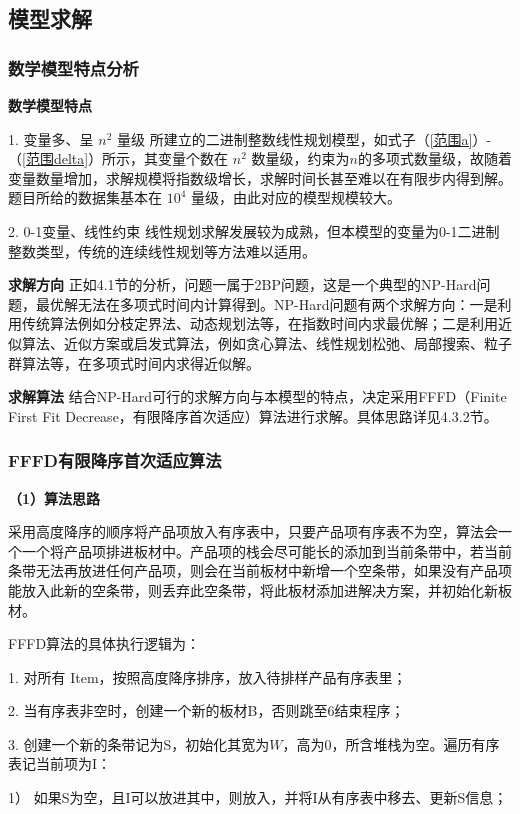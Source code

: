 \documentclass[bwprint]{gmcmthesis}
\begin{document}
\subsection{模型求解}
	
\subsubsection{数学模型特点分析}
	\textbf{数学模型特点} 
	
	1. 变量多、呈 $ n^2 $ 量级 \quad 所建立的二进制整数线性规划模型，如式子（\ref{范围a}）-（\ref{范围delta}）所示，其变量个数在 $ n^2 $ 数量级，约束为$ n $的多项式数量级，故随着变量数量增加，求解规模将指数级增长，求解时间长甚至难以在有限步内得到解。 题目所给的数据集基本在 $ 10^4 $ 量级，由此对应的模型规模较大。
	
	2. 0-1变量、线性约束 \quad	线性规划求解发展较为成熟，但本模型的变量为0-1二进制整数类型，传统的连续线性规划等方法难以适用。
	
	\textbf{求解方向} \quad 正如4.1节的分析，问题一属于2BP问题，这是一个典型的NP-Hard问题，最优解无法在多项式时间内计算得到。NP-Hard问题有两个求解方向：一是利用传统算法例如分枝定界法、动态规划法等，在指数时间内求最优解；二是利用近似算法、近似方案或启发式算法，例如贪心算法、线性规划松弛、局部搜索、粒子群算法等，在多项式时间内求得近似解。
	
	\textbf{求解算法} \quad 结合NP-Hard可行的求解方向与本模型的特点，决定采用FFFD（Finite First Fit Decrease，有限降序首次适应）算法进行求解。具体思路详见4.3.2节。


\subsubsection{FFFD有限降序首次适应算法}
	\textbf{（1）算法思路}
	
	采用高度降序的顺序将产品项放入有序表中，只要产品项有序表不为空，算法会一个一个将产品项排进板材中。产品项的栈会尽可能长的添加到当前条带中，若当前条带无法再放进任何产品项，则会在当前板材中新增一个空条带，如果没有产品项能放入此新的空条带，则丢弃此空条带，将此板材添加进解决方案，并初始化新板材。
	
	FFFD算法的具体执行逻辑为：
	
	1. 对所有 {\rm Item}，按照高度降序排序，放入待排样产品有序表里；
	
	2. 当有序表非空时，创建一个新的板材B，否则跳至6结束程序；
	
	3. 创建一个新的条带记为S，初始化其宽为$W$，高为0，所含堆栈为空。遍历有序表记当前项为I：
	
	1） 如果S为空，且I可以放进其中，则放入，并将I从有序表中移去、更新S信息；
	
\end{document}
